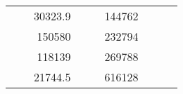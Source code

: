 \begin{table}[H]
\begin{tabular}{|ccrccrccc}
\multicolumn{1}{|c|}{\cellcolor[HTML]{FFFFC7}}                                & \multicolumn{1}{c|}{\cellcolor[HTML]{DDFDFF}}                      & \multicolumn{1}{r|}{\cellcolor[HTML]{DAE8FC}30323.9}   & \multicolumn{1}{c|}{\cellcolor[HTML]{FFFFC7}}                                & \multicolumn{1}{c|}{\cellcolor[HTML]{DDFDFF}}                       & \multicolumn{1}{r|}{\cellcolor[HTML]{DDFDFF}144762}    &                                                                              &                                                                    &                                                        \\ \cline{3-3} \cline{6-6}
\multicolumn{1}{|c|}{\cellcolor[HTML]{FFFFC7}}                                & \multicolumn{1}{c|}{\cellcolor[HTML]{DDFDFF}}                      & \multicolumn{1}{r|}{\cellcolor[HTML]{DDFDFF}150580}    & \multicolumn{1}{c|}{\cellcolor[HTML]{FFFFC7}}                                & \multicolumn{1}{c|}{\cellcolor[HTML]{DDFDFF}}                       & \multicolumn{1}{r|}{\cellcolor[HTML]{DAE8FC}232794}    &                                                                              &                                                                    &                                                        \\ \cline{3-3} \cline{6-6}
\multicolumn{1}{|c|}{\cellcolor[HTML]{FFFFC7}}                                & \multicolumn{1}{c|}{\cellcolor[HTML]{DDFDFF}}                      & \multicolumn{1}{r|}{\cellcolor[HTML]{DAE8FC}118139}    & \multicolumn{1}{c|}{\cellcolor[HTML]{FFFFC7}}                                & \multicolumn{1}{c|}{\cellcolor[HTML]{DDFDFF}}                       & \multicolumn{1}{r|}{\cellcolor[HTML]{DDFDFF}269788}    &                                                                              &                                                                    &                                                        \\ \cline{3-3} \cline{6-6}
\multicolumn{1}{|c|}{\cellcolor[HTML]{FFFFC7}}                                & \multicolumn{1}{c|}{\cellcolor[HTML]{DDFDFF}}                      & \multicolumn{1}{r|}{\cellcolor[HTML]{DDFDFF}21744.5}   & \multicolumn{1}{c|}{\cellcolor[HTML]{FFFFC7}}                                & \multicolumn{1}{c|}{\cellcolor[HTML]{DDFDFF}}                       & \multicolumn{1}{r|}{\cellcolor[HTML]{DAE8FC}616128}    &                                                                              &                                                                    &                                                        \\ \cline{3-3} \cline{6-6}

\end{tabular}
\end{table}
